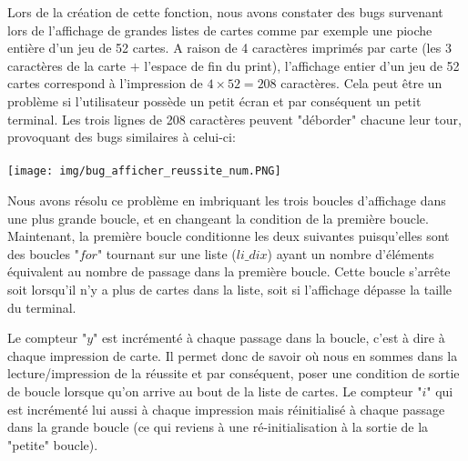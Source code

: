 \documentclass[10pt,a4paper,french,titlepage]{article}
\theoremstyle{definition}
\begin{document}
Lors de la création de cette fonction, nous avons constater des bugs survenant lors de l'affichage de grandes listes de cartes comme par exemple une pioche entière d'un jeu de 52 cartes. A raison de 4 caractères imprimés par carte (les 3 caractères de la carte $+$ l'espace de fin du print), l'affichage entier d'un jeu de 52 cartes correspond à l'impression de $4\times52=208$ caractères. Cela peut être un problème si l'utilisateur possède un petit écran et par conséquent un petit terminal. Les trois lignes de 208 caractères peuvent "déborder" chacune leur tour, provoquant des bugs similaires à  celui-ci:\\\\
\texttt{[image: img/bug\_afficher\_reussite\_num.PNG]}

Nous avons résolu ce problème en imbriquant les trois boucles d'affichage dans une plus grande boucle, et en changeant la condition de la première boucle. Maintenant, la première boucle conditionne les deux suivantes puisqu'elles sont des boucles "$for$" tournant sur une liste ($li\_dix$) ayant un nombre  d'éléments équivalent au nombre de passage dans la première boucle. Cette boucle s'arrête soit lorsqu'il n'y a plus de cartes dans la liste, soit si l'affichage dépasse la taille du terminal. 

Le compteur "$y$" est incrémenté à chaque passage dans la boucle, c'est à dire à chaque impression de carte. Il permet donc de savoir où nous en sommes dans la lecture/impression de la réussite et par conséquent, poser une condition de sortie de boucle lorsque qu'on arrive au bout de la liste de cartes. Le compteur "$i$" qui est incrémenté lui aussi à chaque impression mais réinitialisé à chaque passage dans la grande  boucle (ce qui reviens à une ré-initialisation à la sortie de la "petite" boucle). 
\end{document}
